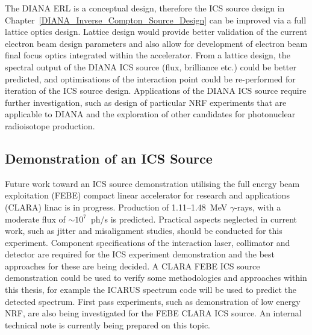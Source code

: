 \documentclass[../main.tex]{subfiles}
\begin{document}
The DIANA ERL is a conceptual design, therefore the ICS source design in Chapter~\ref{DIANA_Inverse_Compton_Source_Design} can be improved via a full lattice optics design. Lattice design would provide better validation of the current electron beam design parameters and also allow for development of electron beam final focus optics integrated within the accelerator. From a lattice design, the spectral output of the DIANA ICS source (flux, brilliance etc.) could be better predicted, and optimisations of the interaction point could be re-performed for iteration of the ICS source design. Applications of the DIANA ICS source require further investigation, such as design of particular NRF experiments that are applicable to DIANA and the exploration of other candidates for photonuclear radioisotope production.     

\subsection{Demonstration of an ICS Source}
Future work toward an ICS source demonstration utilising the full energy beam exploitation (FEBE) compact linear accelerator for research and applications (CLARA) linac \cite{angal2020design} is in progress. Production of 1.11--1.48~\si{\mega\electronvolt} $\gamma$-rays, with a moderate flux of $\sim 10^{7}$~ph/\si{\second} is predicted. Practical aspects neglected in current work, such as jitter and misalignment studies, should be conducted for this experiment. Component specifications of the interaction laser, collimator and detector are required for the ICS experiment demonstration and the best approaches for these are being decided. A CLARA FEBE ICS source demonstration could be used to verify some methodologies and approaches within this thesis, for example the \textsc{ICARUS} spectrum code will be used to predict the detected spectrum. First pass experiments, such as demonstration of low energy NRF, are also being investigated for the FEBE CLARA ICS source. An internal technical note is currently being prepared on this topic.
\end{document}
